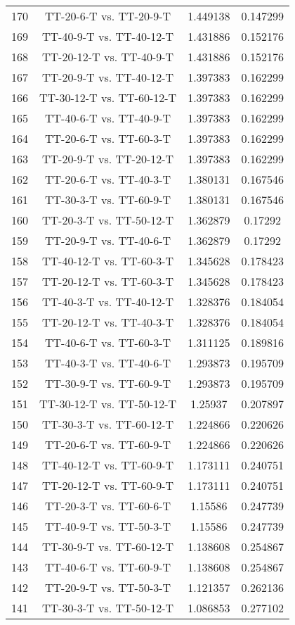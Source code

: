 \documentclass[a4paper,10pt]{article}
\begin{document}
\begin{landscape}
\begin{table}[!htp]
\begin{tabular}{cccc}
170&TT-20-6-T vs. TT-20-9-T&1.449138&0.147299\\
169&TT-40-9-T vs. TT-40-12-T&1.431886&0.152176\\
168&TT-20-12-T vs. TT-40-9-T&1.431886&0.152176\\
167&TT-20-9-T vs. TT-40-12-T&1.397383&0.162299\\
166&TT-30-12-T vs. TT-60-12-T&1.397383&0.162299\\
165&TT-40-6-T vs. TT-40-9-T&1.397383&0.162299\\
164&TT-20-6-T vs. TT-60-3-T&1.397383&0.162299\\
163&TT-20-9-T vs. TT-20-12-T&1.397383&0.162299\\
162&TT-20-6-T vs. TT-40-3-T&1.380131&0.167546\\
161&TT-30-3-T vs. TT-60-9-T&1.380131&0.167546\\
160&TT-20-3-T vs. TT-50-12-T&1.362879&0.17292\\
159&TT-20-9-T vs. TT-40-6-T&1.362879&0.17292\\
158&TT-40-12-T vs. TT-60-3-T&1.345628&0.178423\\
157&TT-20-12-T vs. TT-60-3-T&1.345628&0.178423\\
156&TT-40-3-T vs. TT-40-12-T&1.328376&0.184054\\
155&TT-20-12-T vs. TT-40-3-T&1.328376&0.184054\\
154&TT-40-6-T vs. TT-60-3-T&1.311125&0.189816\\
153&TT-40-3-T vs. TT-40-6-T&1.293873&0.195709\\
152&TT-30-9-T vs. TT-60-9-T&1.293873&0.195709\\
151&TT-30-12-T vs. TT-50-12-T&1.25937&0.207897\\
150&TT-30-3-T vs. TT-60-12-T&1.224866&0.220626\\
149&TT-20-6-T vs. TT-60-9-T&1.224866&0.220626\\
148&TT-40-12-T vs. TT-60-9-T&1.173111&0.240751\\
147&TT-20-12-T vs. TT-60-9-T&1.173111&0.240751\\
146&TT-20-3-T vs. TT-60-6-T&1.15586&0.247739\\
145&TT-40-9-T vs. TT-50-3-T&1.15586&0.247739\\
144&TT-30-9-T vs. TT-60-12-T&1.138608&0.254867\\
143&TT-40-6-T vs. TT-60-9-T&1.138608&0.254867\\
142&TT-20-9-T vs. TT-50-3-T&1.121357&0.262136\\
141&TT-30-3-T vs. TT-50-12-T&1.086853&0.277102\\

\end{tabular}
\end{table}
\end{landscape}
\end{document}
